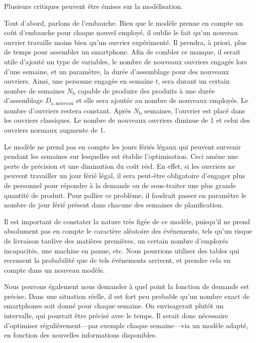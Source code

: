 Plusieurs critiques peuvent être émises sur la modélisation.

Tout d'abord, parlons de  l'embauche. Bien que le modèle prenne en compte un coût d'embauche pour chaque nouvel employé, il oublie le fait qu'un nouveau ouvrier travaille moins bien qu'un ouvrier expérimenté. Il prendra, à priori, plus de temps pour assembler un smartphone. Afin de combler ce manque, il serait utile d'ajouté un type de variables, le nombre de nouveaux ouvriers engagés lors d'une semaine, et un paramètre, la durée d'assemblage pour des nouveaux ouvriers. Ainsi, une personne engagée en semaine $t$, sera durant un certain nombre de semaines $N_\mathrm{b}$ capable de produire des produits à une durée d'assemblage $D_\mathrm{a,nouveau}$ et elle sera ajoutée au nombre de nouveaux employés. Le nombre d'ouvriers restera constant. Après $N_\mathrm{b}$ semaines, l'ouvrier est placé dans les ouvriers classiques. Le nombre de nouveaux ouvriers diminue de 1 et celui des ouvriers normaux augmente de 1.

Le modèle ne prend pas en compte les jours fériés légaux qui peuvent survenir pendant les semaines sur lesquelles est établie l'optimisation. Ceci amène une perte de précision et une diminution du coût réel. En effet, si les ouvriers ne peuvent travailler un jour férié légal, il sera peut-être obligatoire d'engager plus de personnel pour répondre à la demande ou de sous-traiter une plus grande quantité de produit. Pour pallier ce problème, il faudrait passer en paramètre le nombre de jour férié présent dans chacune des semaines de planification\footnotemark.

Il est important de constater la nature très figée de ce modèle, puisqu'il ne prend absolument pas en compte le caractère aléatoire des événements, tels qu'un risque de livraison tardive des matières premières, un certain nombre d'employés incapacités, une machine en panne, etc. Nous pourrions utiliser des tables qui recensent la probabilité que de tels événements arrivent, et prendre cela en compte dans un nouveau modèle.

Nous pouvons également nous demander à quel point la fonction de demande est précise. Dans une situation réelle, il est fort peu probable qu'un nombre exact de smartphones soit donné pour chaque semaine. On envisagerait plutôt un intervalle, qui pourrait être précisé avec le temps. Il serait donc nécessaire d'optimiser régulièrement---par exemple chaque semaine---via un modèle adapté, en fonction des nouvelles informations disponibles.
